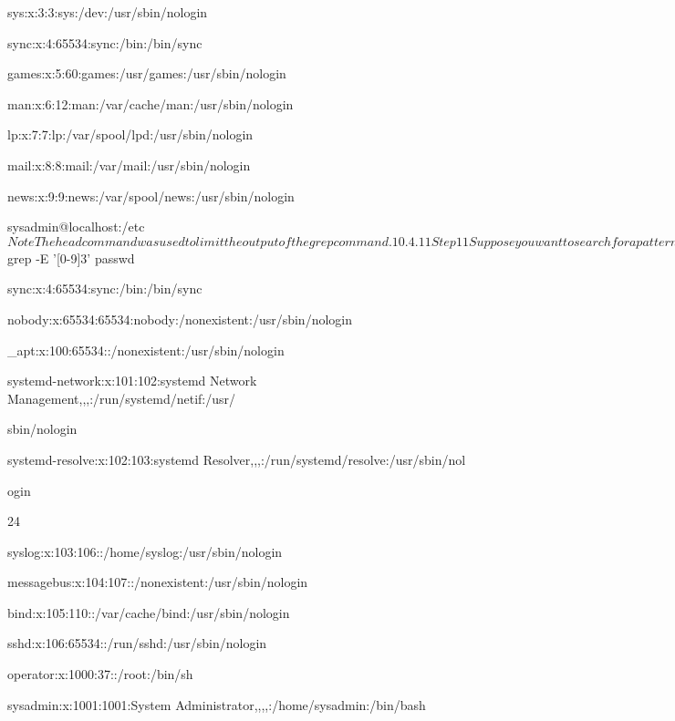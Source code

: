 sys:x:3:3:sys:/dev:/usr/sbin/nologin

sync:x:4:65534:sync:/bin:/bin/sync

games:x:5:60:games:/usr/games:/usr/sbin/nologin

man:x:6:12:man:/var/cache/man:/usr/sbin/nologin

lp:x:7:7:lp:/var/spool/lpd:/usr/sbin/nologin

mail:x:8:8:mail:/var/mail:/usr/sbin/nologin

news:x:9:9:news:/var/spool/news:/usr/sbin/nologin

sysadmin@localhost:/etc$

Note

The head command was used to limit the output of the grep command.

10.4.11 Step 11
Suppose you want to search for a pattern containing a sequence of three digits. You can use { }

characters with a number to express that you want to repeat a pattern a specific number of times;
for example: {3}. The use of the numeric qualifier requires the extended mode of grep:

grep -E '[0-9]{3}' passwd

Your output should be similar to the following:

sysadmin@localhost:/etc$ grep -E '[0-9]{3}' passwd

sync:x:4:65534:sync:/bin:/bin/sync

nobody:x:65534:65534:nobody:/nonexistent:/usr/sbin/nologin

_apt:x:100:65534::/nonexistent:/usr/sbin/nologin

systemd-network:x:101:102:systemd Network Management,,,:/run/systemd/netif:/usr/

sbin/nologin

systemd-resolve:x:102:103:systemd Resolver,,,:/run/systemd/resolve:/usr/sbin/nol

ogin

24



syslog:x:103:106::/home/syslog:/usr/sbin/nologin

messagebus:x:104:107::/nonexistent:/usr/sbin/nologin

bind:x:105:110::/var/cache/bind:/usr/sbin/nologin

sshd:x:106:65534::/run/sshd:/usr/sbin/nologin

operator:x:1000:37::/root:/bin/sh

sysadmin:x:1001:1001:System Administrator,,,,:/home/sysadmin:/bin/bash

